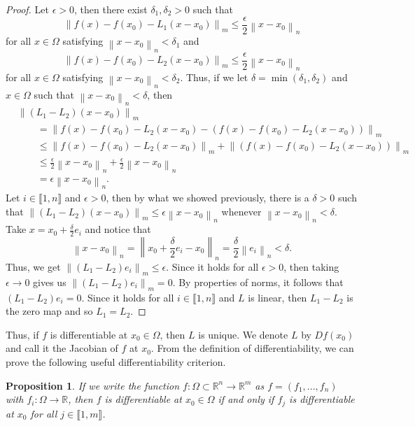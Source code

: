 \documentclass{article}
\theoremstyle{plain}
\newtheorem{proposition}[theorem]{Proposition}
\theoremstyle{definition}
\newcommand{\R}{\mathbb{R}}
\newcommand{\Iint}[2]{\llbracket #1 , #2 \rrbracket}
\newcommand{\lnorm}[2]{\left\lVert#2 \right\rVert_{#1}}
\begin{document}
\begin{proof}
    Let $\epsilon > 0$, then there exist $\delta_1, \delta_2 > 0$ such that 
    $$\lnorm{m}{f(x) - f(x_0) - L_1(x - x_0)} \leq \frac{\epsilon}{2} \lnorm{n}{x - x_0}$$
    for all $x \in \Omega$ satisfying $\lnorm{n}{x - x_0} < \delta_1$ and 
    $$\lnorm{m}{f(x) - f(x_0) - L_2(x - x_0)} \leq \frac{\epsilon}{2} \lnorm{n}{x - x_0}$$
    for all $x \in \Omega$ satisfying $\lnorm{n}{x - x_0} < \delta_2$. Thus, if we let $\delta = \min(\delta_1, \delta_2)$ and $x \in \Omega$ such that $\lnorm{n}{x - x_0} < \delta$, then 
    \begin{align*}
        &\lnorm{m}{(L_1 - L_2)(x - x_0)} \\
        &\qquad = \lnorm{m}{f(x) - f(x_0) - L_2(x - x_0) - (f(x) - f(x_0) - L_2(x - x_0))} \\
        &\qquad \leq \lnorm{m}{f(x) - f(x_0) - L_2(x - x_0)} + \lnorm{m}{(f(x) - f(x_0) - L_2(x - x_0))} \\
        &\qquad \leq \frac{\epsilon}{2}\lnorm{n}{x - x_0} + \frac{\epsilon}{2}\lnorm{n}{x - x_0} \\
        &\qquad = \epsilon\lnorm{n}{x - x_0}.
    \end{align*}
    Let $i \in \Iint{1}{n}$ and $\epsilon > 0$, then by what we showed previously, there is a $\delta > 0$ such that $\lnorm{m}{(L_1 - L_2)(x - x_0)} \leq \epsilon \lnorm{n}{x - x_0}$ whenever $\lnorm{n}{x - x_0} < \delta$. Take $x = x_0 + \frac{\delta}{2}e_i$ and notice that
    $$\lnorm{n}{x - x_0} = \lnorm{n}{x_0 + \frac{\delta}{2}e_i - x_0} = \frac{\delta}{2}\lnorm{n}{e_i} < \delta.$$ 
    Thus, we get $\lnorm{m}{(L_1 - L_2)e_i} \leq \epsilon$. Since it holds for all $\epsilon > 0$, then taking $\epsilon \rightarrow 0$ gives us $\lnorm{m}{(L_1 - L_2)e_i} = 0$. By properties of norms, it follows that $(L_1 - L_2)e_i = 0$. Since it holds for all $i \in \Iint{1}{n}$ and $L$ is linear, then $L_1 - L_2$ is the zero map and so $L_1 = L_2$.
\end{proof}

Thus, if $f$ is differentiable at $x_0 \in \Omega$, then $L$ is unique. We denote $L$ by $Df(x_0)$ and call it the Jacobian of $f$ at $x_0$. From the definition of differentiability, we can prove the following useful differentiability criterion.

\begin{proposition}
    If we write the function $f: \Omega \subset \R^n \to \R^m$ as $f = (f_1, ..., f_n)$ with $f_i : \Omega \to \R$, then $f$ is differentiable at $x_0 \in \Omega$ if and only if $f_j$ is differentiable at $x_0$ for all $j \in \Iint{1}{m}$.
\end{proposition}
\end{document}
